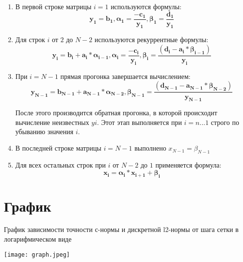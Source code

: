\documentclass[a4paper,12pt]{report}
\begin{document}
    \begin{enumerate}
        \item В первой строке матрицы $i = 1$ используются формулы:
    \[\mathbf{y_1=b_1, \alpha_1=\frac{-c_1}{y_1}, \beta_1=\frac{d_1}{y_1}}\]
        \item Для строк $i$ от $2$ до $N-2$ используются рекуррентные формулы:
    \[\mathbf{y_i=b_i+a_i*\alpha_{i-1}, \alpha_i=\frac{-c_i}{y_i}, \beta_i=\frac{(d_i-a_i*\beta_{i-1})}{y_i}}\]
        \item При $i = N - 1$ прямая прогонка завершается вычислением: 
    \[\mathbf{y_{N-1}=b_{N-1}+a_{N-1}*\alpha_{N-2}, \beta_{N-1}=\frac{(d_{N-1}-a_{N-1}*\beta_{N-2})}{y_{N-1}}}\]
    
    После этого производится обратная прогонка, в которой происходит вычисление неизвестных $yi$. Этот этап выполняется при $i = n...1$ строго по
    убыванию значения $i$.
        \item В последней строке матрицы $i = N - 1$ выполнено $x_{N-1} = \beta_{N-1}$
    \newline
        \item Для всех остальных строк при $i$ от $N-2$ до $1$ применяется формула:
    \[\mathbf{x_i=\alpha_i*x_{i+1}+\beta_{i}}\]

    \end{enumerate}

    \section*{График}
    
    График зависимости точности с-нормы и дискретной l2-нормы от шага сетки в логарифмическом виде

    
    \texttt{[image: graph.jpeg]}
    

    
\end{document}
